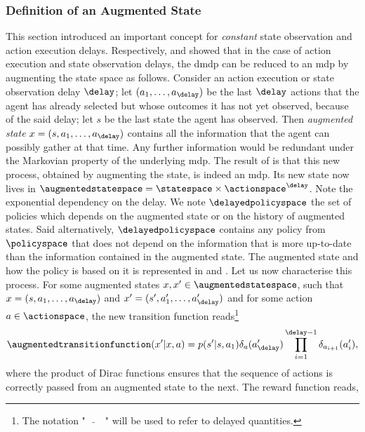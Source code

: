 \subsubsection{Definition of an Augmented State}
\label{subsubsec:theory_augmented_space}
This section introduced an important concept for \emph{constant} state observation and action execution delays.  
Respectively, \cite{bertsekas1987dynamic} and \cite{altman1992closed} showed that in the case of action execution and state observation delays, the \gls{dmdp} can be reduced to an \gls{mdp} by augmenting the state space as follows. Consider an action execution or state observation delay $\delay$; let $(a_1,\dots,a_{\delay})$
be the last $\delay$ actions that the agent has already selected but whose outcomes it has not yet observed, because of the said delay; let $s$ be the last state the agent has observed. 
Then \emph{augmented state} $x=(s,a_1,\dots,a_\delay)$ contains all the information that the agent can possibly gather at that time. 
Any further information would be redundant under the Markovian property of the underlying \gls{mdp}.
The result of \cite{bertsekas1987dynamic,altman1992closed} is that this new process, obtained by augmenting the state, is indeed an \gls{mdp}.
Its new state now lives in $\augmentedstatespace=\statespace\times\actionspace^\delay$. 
Note the exponential dependency on the delay. 
We note $\delayedpolicyspace$ the set of policies which depends on the augmented state or on the history of augmented states. 
Said alternatively, $\delayedpolicyspace$ contains any policy from $\policyspace$ that does not depend on the information that is more up-to-date than the information contained in the augmented state.
The augmented state and how the policy is based on it is represented in  and .
Let us now characterise this process. For some augmented states $x,x'\in\augmentedstatespace$, such that $x=(s,a_1,\dots,a_{\delay})$ and $x'=(s',a_1',\dots,a_{\delay}')$ and for some action $a\in\actionspace$, the  
new transition function reads\footnote{The notation "~~$\widetilde{}$~~" will be used to refer to delayed quantities.}
\begin{align*}
    \augmentedtransitionfunction(x'\vert x,a) = p(s'\vert s,a_1)\delta_a(a_{\delay}')\prod_{i=1}^{\delay-1}\delta_{a_{i+1}}(a_{i}'),
\end{align*}
where the product of Dirac functions ensures that the sequence of actions is correctly passed from an augmented state to the next. 
The reward function reads,
